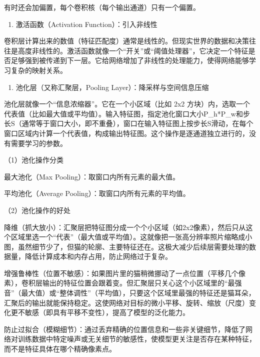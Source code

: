 有时还会加偏置，每个卷积核（每个输出通道）只有一个偏置。

\begin{enumerate}
\def\labelenumi{\arabic{enumi}.}
\setcounter{enumi}{1}
\tightlist
\item
  激活函数（Activation Function）：引入非线性
\end{enumerate}

卷积层计算出来的数值（特征匹配度）通常是线性的。但现实世界的数据和决策往往是高度非线性的。激活函数就像一个``开关''或``阈值处理器''，它决定一个特征是否足够强到被传递到下一层。它给网络增加了非线性的处理能力，使得网络能够学习复杂的映射关系。

\begin{enumerate}
\def\labelenumi{\arabic{enumi}.}
\setcounter{enumi}{2}
\tightlist
\item
  池化层（又称汇聚层，Pooling Layer）：降采样与空间信息压缩
\end{enumerate}

池化层就像一个``信息浓缩器''。它在一个小区域（比如 2x2 方块）内，选取一个代表值（比如最大值或平均值）。输入特征图，指定池化窗口大小P\_h*P\_w和步长S（通常等于窗口大小，即不重叠），窗口在输入特征图上按步长S滑动，在每个窗口区域内计算一个代表值，构成输出特征图。这个操作是逐通道独立进行的，没有需要学习的参数。

（1）池化操作分类

最大池化（Max Pooling）：取窗口内所有元素的最大值。

平均池化（Average Pooling）：取窗口内所有元素的平均值。

（2）池化操作的好处

降维（抓大放小）：汇聚层把特征图分成一个个小区域（如2x2像素），然后只从这个区域里选一个``代表''（最大值或平均值）。这就像把一张高分辨率照片缩略成小图，虽然细节少了，但猫的轮廓、主要特征还在。这极大减少后续层需要处理的数据量，降低计算成本和内存占用，防止网络过于复杂。

增强鲁棒性（位置不敏感）：如果图片里的猫稍微挪动了一点位置（平移几个像素），卷积层输出的特征位置会跟着变。但汇聚层只关心这个小区域里的``最强音''（最大值）或``整体调性''（平均值），只要这个区域里最强的特征还是猫耳朵，汇聚后的输出就能保持稳定。这使网络对目标的微小平移、旋转、缩放（尺度）变化更不敏感（即具有平移不变性），提高了模型的泛化能力。

防止过拟合（模糊细节）：通过丢弃精确的位置信息和一些非关键细节，降低了网络对训练数据中特定噪声或无关细节的敏感性，使模型更关注是否存在某种特征，而不是特征具体在哪个精确像素点。

